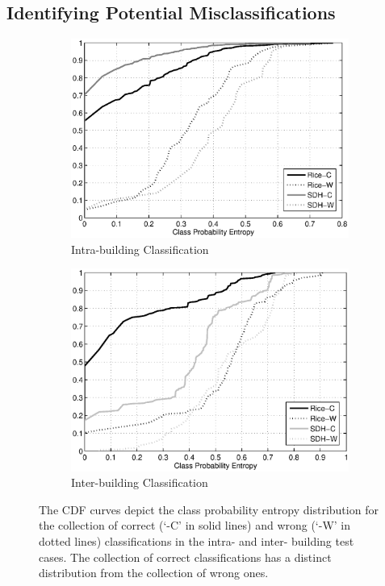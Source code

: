 \subsection{Identifying Potential Misclassifications}
\begin{figure}[ht!]
\centering
	\begin{subfigure}{0.48\textwidth}
                \centering
		\includegraphics[width=\textwidth]{./fig/cdf_intra.eps}
                \caption{Intra-building Classification}
                \label{fig:cdf_intra}
	\end{subfigure}
	\begin{subfigure}{0.48\textwidth}
                \centering
		\includegraphics[width=\textwidth]{./fig/cdf_inter.eps}
                \caption{Inter-building Classification}
                \label{fig:cdf_inter}
	\end{subfigure}
\caption{The CDF curves depict the class probability entropy distribution for the collection of correct (`-C' in solid lines) and wrong (`-W' in dotted lines) classifications in the intra- and inter- building test cases. The collection of correct classifications has a distinct distribution from the collection of wrong ones.}
\label{fig:cdf}
\end{figure}

